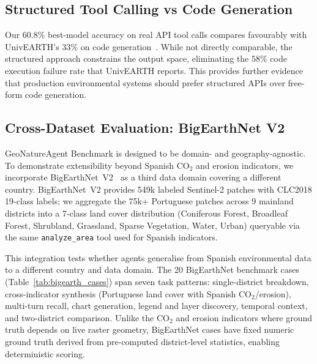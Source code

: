\documentclass[10pt,twocolumn]{article}
\begin{document}
\subsection{Structured Tool Calling vs Code Generation}

Our 60.8\% best-model accuracy on real API tool calls compares favourably with UnivEARTH's 33\% on code generation~\citep{kao2025univearth}. While not directly comparable, the structured approach constrains the output space, eliminating the 58\% code execution failure rate that UnivEARTH reports. This provides further evidence that production environmental systems should prefer structured APIs over free-form code generation.

\subsection{Cross-Dataset Evaluation: BigEarthNet V2}
\label{sec:validation}

GeoNatureAgent Benchmark is designed to be domain- and geography-agnostic. To demonstrate extensibility beyond Spanish CO$_2$ and erosion indicators, we incorporate BigEarthNet~V2~\citep{clasen2024reben} as a third data domain covering a different country. BigEarthNet~V2 provides 549k labeled Sentinel-2 patches with CLC2018 19-class labels; we aggregate the 75k+ Portuguese patches across 9 mainland districts into a 7-class land cover distribution (Coniferous Forest, Broadleaf Forest, Shrubland, Grassland, Sparse Vegetation, Water, Urban) queryable via the same \texttt{analyze\_area} tool used for Spanish indicators.

This integration tests whether agents generalise from Spanish environmental data to a different country and data domain. The 20 BigEarthNet benchmark cases (Table~\ref{tab:bigearth_cases}) span seven task patterns: single-district breakdown, cross-indicator synthesis (Portuguese land cover with Spanish CO$_2$/erosion), multi-turn recall, chart generation, legend and layer discovery, temporal context, and two-district comparison. Unlike the CO$_2$ and erosion indicators where ground truth depends on live raster geometry, BigEarthNet cases have fixed numeric ground truth derived from pre-computed district-level statistics, enabling deterministic scoring.
\end{document}
